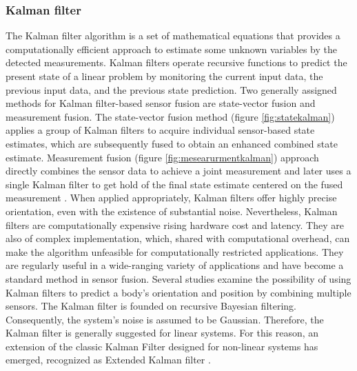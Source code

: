 \subsubsection{Kalman filter}
The Kalman filter algorithm is a set of mathematical equations that provides a computationally efficient approach to estimate some unknown variables by the detected measurements\cite{welch1995introduction}. Kalman filters operate recursive functions to predict the present state of a linear problem by monitoring the current input data, the previous input data, and the previous state prediction.  Two generally assigned methods for Kalman filter-based sensor fusion are state-vector fusion and measurement fusion. The state-vector fusion method (figure \ref{fig:statekalman}) applies a group of Kalman filters to acquire individual sensor-based state estimates, which are subsequently fused to obtain an enhanced combined state estimate. Measurement fusion (figure \ref{fig:mesearurmentkalman}) approach directly combines the sensor data to achieve a joint measurement and later uses a single Kalman filter to get hold of the final state estimate centered on the fused measurement \cite{mosallaei2007process}.
When applied appropriately, Kalman filters offer highly precise orientation, even with the existence of substantial noise. Nevertheless, Kalman filters are computationally expensive rising hardware cost and latency. They are also of complex implementation, which, shared with computational overhead, can make the algorithm unfeasible for computationally restricted applications. They are regularly useful in a wide-ranging variety of applications and have become a standard method in sensor fusion. Several studies examine the possibility of using Kalman filters to predict a body’s orientation and position by combining multiple sensors. The Kalman filter is founded on recursive Bayesian filtering.
Consequently, the system’s noise is assumed to be Gaussian. Therefore, the Kalman filter is generally suggested for linear systems. For this reason, an extension of the classic Kalman Filter designed for non-linear systems has emerged, recognized as Extended Kalman filter \cite{wilson2019formulation}.


